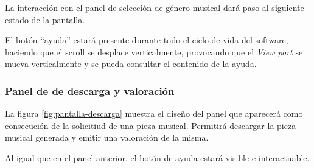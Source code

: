La interacción con el panel de selección de género musical dará paso al siguiente estado de la pantalla.

El botón ``ayuda'' estará presente durante todo el ciclo de vida del software, haciendo que el scroll se desplace verticalmente, provocando que el \emph{View port} se mueva verticalmente y se pueda consultar el contenido de la ayuda.
 
\subsubsection{Panel de de descarga y valoración}

La figura \ref{fig:pantalla-descarga} muestra el diseño del panel que aparecerá como consecución de la solicitiud de una pieza musical. Permitirá descargar la pieza musical generada y emitir una valoración de la misma.


Al igual que en el panel anterior, el botón de ayuda estará visible e interactuable.

